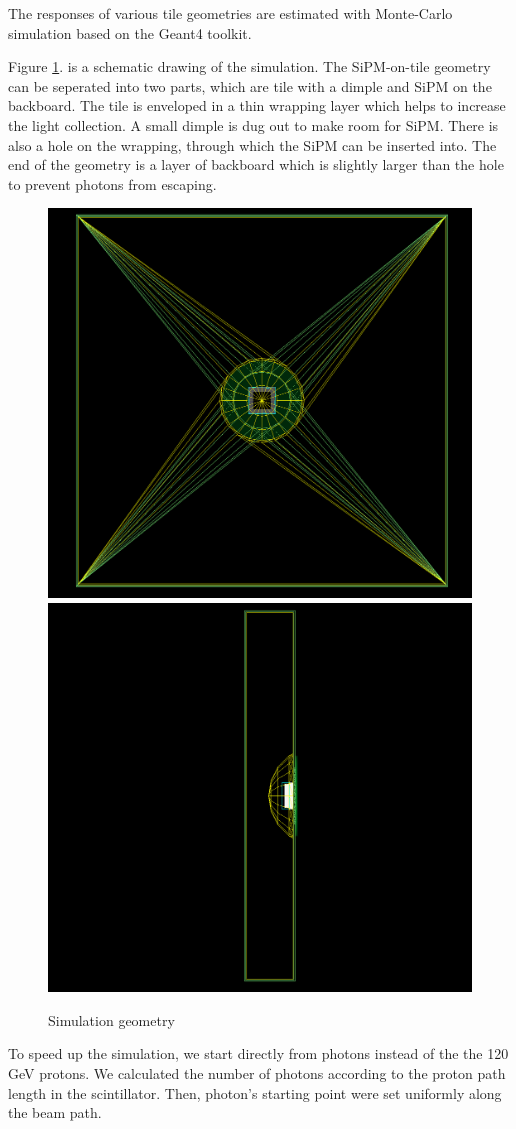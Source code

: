 \documentclass[a4paper,11pt]{article}
\begin{document}
The responses of various tile geometries are estimated with Monte-Carlo simulation based on the Geant4 toolkit\cite{geant4}.

Figure \ref{fig:g4simu}. is a schematic drawing of the simulation. 
The SiPM-on-tile geometry can be seperated into two parts, 
which are tile with a dimple and SiPM on the backboard. 
The tile is enveloped in a thin wrapping layer which helps to increase the light collection.
A small dimple is dug out to make room for SiPM. 
There is also a hole on the wrapping, through which the SiPM can be inserted into.
The end of the geometry is a layer of backboard 
which is slightly larger than the hole to prevent photons from escaping.

\begin{figure}[htbp]
\centering %
\includegraphics[width=.45\textwidth]{front.png}
\includegraphics[width=.45\textwidth]{side.png}
\caption{\label{fig:g4simu} Simulation geometry}
\end{figure}

To speed up the simulation, we start directly from photons instead of the the 120 GeV protons.
We calculated the number of photons according to the proton path length in the scintillator. 
Then, photon's starting point were set uniformly along the beam path. 
\end{document}
